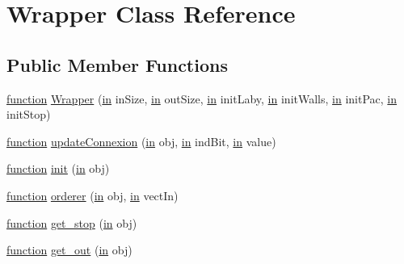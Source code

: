 \hypertarget{class_wrapper}{}\section{Wrapper Class Reference}
\label{class_wrapper}
\subsection*{Public Member Functions}
\begin{DoxyCompactItemize}
\item 
\hyperlink{_plan__desuma_functions_8m_ac2ffb26d6f42d3bbcd7847b0873403f4}{function} \hyperlink{class_wrapper_ab0ebf6c7738beb446d13d2d9445fbc8a}{Wrapper} (\hyperlink{class_wrapper_a5e252d97ca5bf85c5753e2914673eead}{in} in\+Size, \hyperlink{class_wrapper_a5e252d97ca5bf85c5753e2914673eead}{in} out\+Size, \hyperlink{class_wrapper_a5e252d97ca5bf85c5753e2914673eead}{in} init\+Laby, \hyperlink{class_wrapper_a5e252d97ca5bf85c5753e2914673eead}{in} init\+Walls, \hyperlink{class_wrapper_a5e252d97ca5bf85c5753e2914673eead}{in} init\+Pac, \hyperlink{class_wrapper_a5e252d97ca5bf85c5753e2914673eead}{in} init\+Stop)
\item 
\hyperlink{_plan__desuma_functions_8m_ac2ffb26d6f42d3bbcd7847b0873403f4}{function} \hyperlink{class_wrapper_aa41b9b215897635f48e1c8a4eaca7640}{update\+Connexion} (\hyperlink{class_wrapper_a5e252d97ca5bf85c5753e2914673eead}{in} obj, \hyperlink{class_wrapper_a5e252d97ca5bf85c5753e2914673eead}{in} ind\+Bit, \hyperlink{class_wrapper_a5e252d97ca5bf85c5753e2914673eead}{in} value)
\item 
\hyperlink{_plan__desuma_functions_8m_ac2ffb26d6f42d3bbcd7847b0873403f4}{function} \hyperlink{class_wrapper_a7d486dd79e7c7bc857ffaa4e273d27c5}{init} (\hyperlink{class_wrapper_a5e252d97ca5bf85c5753e2914673eead}{in} obj)
\item 
\hyperlink{_plan__desuma_functions_8m_ac2ffb26d6f42d3bbcd7847b0873403f4}{function} \hyperlink{class_wrapper_a9c889c73b9d4b80dde64dfe385ed747e}{orderer} (\hyperlink{class_wrapper_a5e252d97ca5bf85c5753e2914673eead}{in} obj, \hyperlink{class_wrapper_a5e252d97ca5bf85c5753e2914673eead}{in} vect\+In)
\item 
\hyperlink{_plan__desuma_functions_8m_ac2ffb26d6f42d3bbcd7847b0873403f4}{function} \hyperlink{class_wrapper_aaba4a98b8b3bf391348722f0f227e333}{get\+\_\+stop} (\hyperlink{class_wrapper_a5e252d97ca5bf85c5753e2914673eead}{in} obj)
\item 
\hyperlink{_plan__desuma_functions_8m_ac2ffb26d6f42d3bbcd7847b0873403f4}{function} \hyperlink{class_wrapper_a15af7c208437e3c98d1f130b45a36a37}{get\+\_\+out} (\hyperlink{class_wrapper_a5e252d97ca5bf85c5753e2914673eead}{in} obj)
\end{DoxyCompactItemize}
